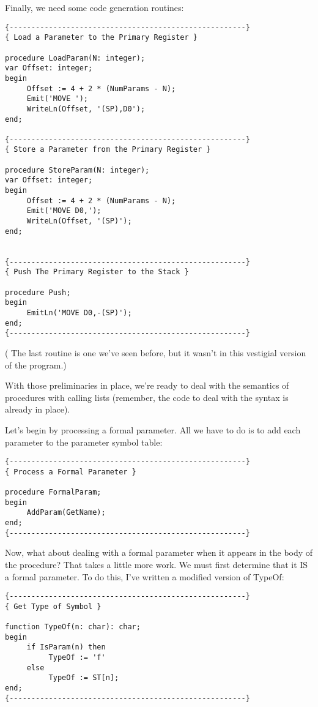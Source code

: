 Finally, we need some code generation routines:

\begin{verbatim}
{------------------------------------------------------}
{ Load a Parameter to the Primary Register }

procedure LoadParam(N: integer);
var Offset: integer;
begin
     Offset := 4 + 2 * (NumParams - N);
     Emit('MOVE ');
     WriteLn(Offset, '(SP),D0');
end;

{------------------------------------------------------}
{ Store a Parameter from the Primary Register }

procedure StoreParam(N: integer);
var Offset: integer;
begin
     Offset := 4 + 2 * (NumParams - N);
     Emit('MOVE D0,');
     WriteLn(Offset, '(SP)');
end;


{------------------------------------------------------}
{ Push The Primary Register to the Stack }

procedure Push;
begin
     EmitLn('MOVE D0,-(SP)');
end;
{------------------------------------------------------}
\end{verbatim}

( The last routine is one we've seen  before, but  it  wasn't in this vestigial version of the program.)

With those preliminaries in place, we're ready to  deal  with the semantics of procedures with calling lists (remember, the code to deal with the syntax is already in place).

Let's begin by processing a formal parameter. All we have  to do is to add each parameter to the parameter symbol table:

\begin{verbatim}
{------------------------------------------------------}
{ Process a Formal Parameter }

procedure FormalParam;
begin
     AddParam(GetName);
end;
{------------------------------------------------------}
\end{verbatim}

Now, what about dealing with a formal parameter  when  it appears in the body of the procedure?  That takes a little more work. We must first determine that it IS a formal parameter. To  do this, I've written a modified version of TypeOf:

\begin{verbatim}
{------------------------------------------------------}
{ Get Type of Symbol }

function TypeOf(n: char): char;
begin
     if IsParam(n) then
          TypeOf := 'f'
     else
          TypeOf := ST[n];
end;
{------------------------------------------------------}
\end{verbatim}

